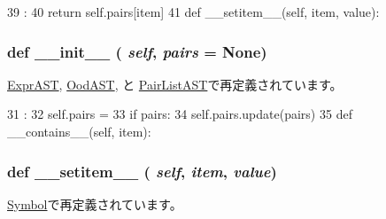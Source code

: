 \begin{DoxyCode}
39                                :
40         return self.pairs[item]
41 
    def __setitem__(self, item, value):
\end{DoxyCode}
\hypertarget{classslicc_1_1util_1_1PairContainer_ac775ee34451fdfa742b318538164070e}{
\subsubsection[{\_\-\_\-init\_\-\_\-}]{\setlength{\rightskip}{0pt plus 5cm}def \_\-\_\-init\_\-\_\- ( {\em self}, \/   {\em pairs} = {\ttfamily None})}}
\label{classslicc_1_1util_1_1PairContainer_ac775ee34451fdfa742b318538164070e}


\hyperlink{classslicc_1_1ast_1_1ExprAST_1_1ExprAST_ac775ee34451fdfa742b318538164070e}{ExprAST}, \hyperlink{classslicc_1_1ast_1_1OodAST_1_1OodAST_ac775ee34451fdfa742b318538164070e}{OodAST}, と \hyperlink{classslicc_1_1ast_1_1PairListAST_1_1PairListAST_ac775ee34451fdfa742b318538164070e}{PairListAST}で再定義されています。


\begin{DoxyCode}
31                                   :
32         self.pairs = {}
33         if pairs:
34             self.pairs.update(pairs)
35 
    def __contains__(self, item):
\end{DoxyCode}
\hypertarget{classslicc_1_1util_1_1PairContainer_a09195b01147e970ca71c48b57f653940}{
\subsubsection[{\_\-\_\-setitem\_\-\_\-}]{\setlength{\rightskip}{0pt plus 5cm}def \_\-\_\-setitem\_\-\_\- ( {\em self}, \/   {\em item}, \/   {\em value})}}
\label{classslicc_1_1util_1_1PairContainer_a09195b01147e970ca71c48b57f653940}


\hyperlink{classslicc_1_1symbols_1_1Symbol_1_1Symbol_a09195b01147e970ca71c48b57f653940}{Symbol}で再定義されています。


